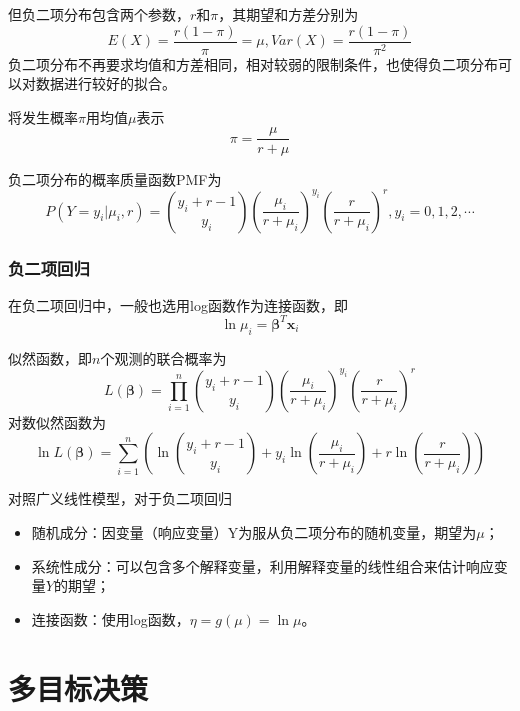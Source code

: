 但负二项分布包含两个参数，$r$和$\pi$，其期望和方差分别为
\begin{equation}
    E(X) = \frac{r(1-\pi)}{\pi} = \mu, Var(X) = \frac{r(1-\pi)}{\pi^2}
\end{equation}
负二项分布不再要求均值和方差相同，相对较弱的限制条件，也使得负二项分布可以对数据进行较好的拟合。

将发生概率$\pi$用均值$\mu$表示
\begin{equation}
    \pi = \frac{\mu}{r+\mu}
\end{equation}

负二项分布的概率质量函数PMF为
\begin{equation}
    P(Y=y_i|\mu_i,r) = \binom{y_i+r-1}{y_i}\left(\frac{\mu_i}{r+\mu_i}\right)^{y_i}\left(\frac{r}{r+\mu_i}\right)^r,y_i=0,1,2,\cdots
\end{equation}

\subsubsection{负二项回归}

在负二项回归中，一般也选用log函数作为连接函数，即
\begin{equation}
    \ln \mu_i =\bm{\beta}^T \mathbf{x}_i
\end{equation}

似然函数，即$n$个观测的联合概率为
\begin{equation}
    L(\bm{\beta}) = \prod_{i=1}^n \binom{y_i+r-1}{y_i}\left(\frac{\mu_i}{r+\mu_i}\right)^{y_i}\left(\frac{r}{r+\mu_i}\right)^r
\end{equation}
对数似然函数为
\begin{equation}
    \ln L(\bm{\beta}) = \sum_{i=1}^n \left(\ln \binom{y_i+r-1}{y_i} + y_i \ln \left(\frac{\mu_i}{r+\mu_i}\right) + r \ln \left(\frac{r}{r+\mu_i}\right)\right)
\end{equation}

对照广义线性模型，对于负二项回归
\begin{itemize}[itemsep=0pt,parsep=0pt]
    \item 随机成分：因变量（响应变量）Y为服从负二项分布的随机变量，期望为$\mu$；
    \item 系统性成分：可以包含多个解释变量，利用解释变量的线性组合来估计响应变量$Y$的期望；
    \item 连接函数：使用log函数，$\eta = g(\mu) = \ln \mu$。
\end{itemize}

\section{多目标决策}

